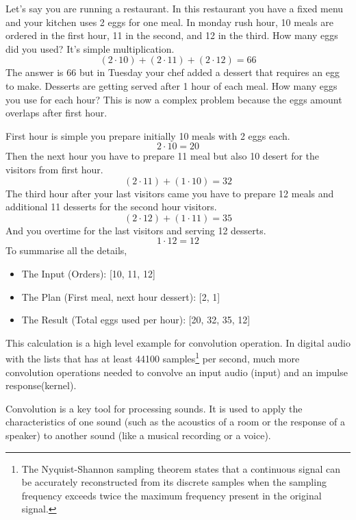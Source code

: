             Let's say you are running a restaurant. In this restaurant you have a fixed menu and your kitchen uses 2 eggs for one meal. In monday rush hour, 10 meals are ordered in the first hour, 11 in the second, and 12 in the third. How many eggs did you used? It's simple multiplication. 
            $$(2\cdot10)+(2\cdot11)+(2\cdot12)=66$$
            The answer is 66 but in Tuesday your chef added a dessert that requires an egg to make. Desserts are getting served after 1 hour of each meal. How many eggs you use for each hour? This is now a complex problem because the eggs amount overlaps after first hour.

            First hour is simple you prepare initially 10 meals with 2 eggs each. 
            $$2\cdot10=20$$
            Then the next hour you have to prepare 11 meal but also 10 desert for the visitors from first hour.
            $$(2\cdot11)+(1\cdot10)=32$$
            The third hour after your last visitors came you have to prepare 12 meals and additional 11 desserts for the second hour visitors.
            $$(2\cdot12)+(1\cdot11)=35$$
            And you overtime for the last visitors and serving 12 desserts.
            $$1\cdot12=12$$
            To summarise all the details,\par
            \begin{itemize}
                \item The Input (Orders): [10, 11, 12]
                \item The Plan (First meal, next hour dessert): [2, 1]
                \item The Result (Total eggs used per hour): [20, 32, 35, 12]
            \end{itemize}
            This calculation is a high level example for convolution operation. In digital audio with the lists that has at least 44100 samples\footnote{The Nyquist-Shannon sampling theorem states that a continuous signal can be accurately reconstructed from its discrete samples when the sampling frequency exceeds twice the maximum frequency present in the original signal\cite{Digital_Audio_Theory}.} per second, much more convolution operations needed to convolve an input audio (input) and an impulse response(kernel).\par

            Convolution is a key tool for processing sounds. It is used to apply the characteristics of one sound (such as the acoustics of a room or the response of a speaker) to another sound (like a musical recording or a voice).\par


